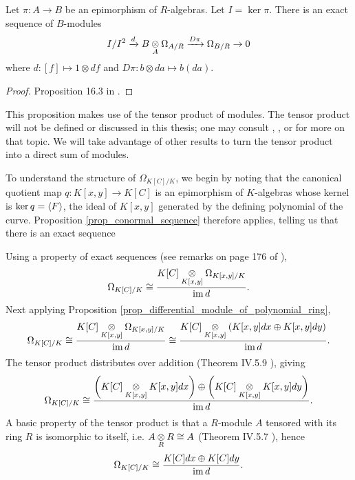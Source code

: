 \begin{proposition}
  \label{prop_conormal_sequence}
  Let $\pi : A \to B$ be an epimorphism of $R$-algebras.
  Let $I = \ker \pi$.
  There is an exact sequence of $B$-modules
    \[ I/I^2 \xrightarrow{d} B \underset{A}{\otimes} \Omega_{A/R} \xrightarrow{D\pi} \Omega_{B/R} \to 0 \]
  where $d : [f] \mapsto 1 \otimes df$ and $D\pi : b \otimes da \mapsto b(da)$.
\end{proposition}
\begin{proof}
  Proposition 16.3 in \cite{eisenbud95}.
\end{proof}

This proposition makes use of the tensor product of modules.
The tensor product will not be defined or discussed in this thesis;
one may consult \cite{dummit04}, \cite{eisenbud95}, or \cite{hungerford} for more on that topic.
We will take advantage of other results to turn the tensor product into a direct sum of modules.

To understand the structure of $\Omega_{K[C]/K}$,
we begin by noting that the canonical quotient map $q : K[x,y] \to K[C]$ is an epimorphism of $K$-algebras
whose kernel is $\ker q = \left\langle F \right\rangle$, the ideal of $K[x,y]$ generated by the defining polynomial of the curve.
Proposition \ref{prop_conormal_sequence} therefore applies, telling us that there is an exact sequence
\begin{center}
\end{center}
Using a property of exact sequences (see remarks on page 176 of \cite{hungerford}), 
\[ \Omega_{K[C]/K} \cong \frac {K[C] \underset{K[x,y]}{\otimes} \Omega_{K[x,y]/K}} {\operatorname{im} d}. \]
Next applying Proposition \ref{prop_differential_module_of_polynomial_ring},
\[ \Omega_{K[C]/K} \cong \frac {K[C] \underset{K[x,y]}{\otimes} \Omega_{K[x,y]/K}} {\operatorname{im} d}
                   \cong \frac {K[C] \underset{K[x,y]}{\otimes} (K[x,y]dx \oplus K[x,y]dy)} {\operatorname{im} d}. \]
The tensor product distributes over addition (Theorem IV.5.9 \cite{hungerford}), giving
\[ \Omega_{K[C]/K} \cong \frac {\left(K[C] \underset{K[x,y]}{\otimes} K[x,y]dx\right) \oplus
                                \left(K[C] \underset{K[x,y]}{\otimes} K[x,y]dy\right)} {\operatorname{im} d}. \]
A basic property of the tensor product is that a $R$-module $A$ tensored with its ring $R$ is isomorphic to itself,
i.e. $A \underset{R}{\otimes} R \cong A$ (Theorem IV.5.7 \cite{hungerford}), hence
\[ \Omega_{K[C]/K} \cong \frac {K[C]dx \oplus K[C]dy} {\operatorname{im} d}. \]

